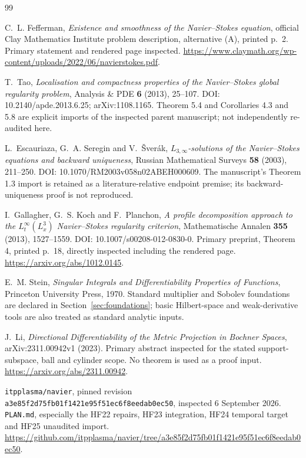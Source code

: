 \documentclass[11pt,a4paper]{article}
\theoremstyle{definition}\newtheorem{definition}[theorem]{Definition}
\theoremstyle{remark}\newtheorem{remark}[theorem]{Remark}
\newcommand{\repo}[1]{{\small\texttt{#1}}}
\numberwithin{equation}{section}
\begin{document}
\begingroup\small{}
\begin{thebibliography}{99}
C.~L. Fefferman, \emph{Existence and smoothness of the Navier--Stokes equation}, official Clay Mathematics Institute problem description, alternative (A), printed p.~2. Primary statement and rendered page inspected. \url{https://www.claymath.org/wp-content/uploads/2022/06/navierstokes.pdf}.

T.~Tao, \emph{Localisation and compactness properties of the Navier--Stokes global regularity problem}, Analysis \& PDE \textbf{6} (2013), 25--107. DOI: 10.2140/apde.2013.6.25; arXiv:1108.1165. Theorem 5.4 and Corollaries 4.3 and 5.8 are explicit imports of the inspected parent manuscript; not independently re-audited here.

L.~Escauriaza, G.~A. Seregin and V.~\v Sver\'ak, \emph{$L_{3,\infty}$-solutions of the Navier--Stokes equations and backward uniqueness}, Russian Mathematical Surveys \textbf{58} (2003), 211--250. DOI: 10.1070/RM2003v058n02ABEH000609. The manuscript's Theorem 1.3 import is retained as a literature-relative endpoint premise; its backward-uniqueness proof is not reproduced.

I.~Gallagher, G.~S. Koch and F.~Planchon, \emph{A profile decomposition approach to the $L^\infty_t(L^3_x)$ Navier--Stokes regularity criterion}, Mathematische Annalen \textbf{355} (2013), 1527--1559. DOI: 10.1007/s00208-012-0830-0. Primary preprint, Theorem 4, printed p.~18, directly inspected including the rendered page. \url{https://arxiv.org/abs/1012.0145}.

E.~M. Stein, \emph{Singular Integrals and Differentiability Properties of Functions}, Princeton University Press, 1970. Standard multiplier and Sobolev foundations are declared in Section~\ref{sec:foundations}; basic Hilbert-space and weak-derivative tools are also treated as standard analytic inputs.

J.~Li, \emph{Directional Differentiability of the Metric Projection in Bochner Spaces}, arXiv:2311.00942v1 (2023). Primary abstract inspected for the stated support-subspace, ball and cylinder scope. No theorem is used as a proof input. \url{https://arxiv.org/abs/2311.00942}.

\repo{itpplasma/navier}, pinned revision \repo{a3e85f2d75fb01f1421e95f51ec6f8eedab0ec50}, inspected 6 September 2026. \repo{PLAN.md}, especially the HF22 repairs, HF23 integration, HF24 temporal target and HF25 unaudited import. \url{https://github.com/itpplasma/navier/tree/a3e85f2d75fb01f1421e95f51ec6f8eedab0ec50}.


\end{thebibliography}
\end{document}
